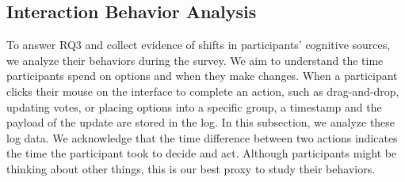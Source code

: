 \subsection{Interaction Behavior Analysis}
To answer RQ3 and collect evidence of shifts in participants' cognitive sources, we analyze their behaviors during the survey. We aim to understand the time participants spend on options and when they make changes. When a participant clicks their mouse on the interface to complete an action, such as drag-and-drop, updating votes, or placing options into a specific group, a timestamp and the payload of the update are stored in the log. In this subsection, we analyze these log data. We acknowledge that the time difference between two actions indicates the time the participant took to decide and act. Although participants might be thinking about other things, this is our best proxy to study their behaviors.

